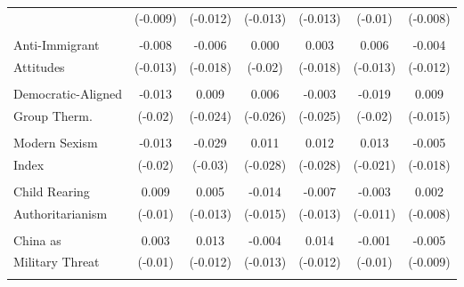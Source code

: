 \documentclass[12pt]{article}
\begin{document}
\begin{appendices}
\begin{refsection}
\begin{table}[!ht]
\begin{adjustbox}{width=\textwidth,center}
\begin{tabular}{@{\extracolsep{5pt}}lcccccc}
                     & (-0.009)           & (-0.012) & (-0.013)  & (-0.013)          & (-0.01)  & (-0.008)      \\
                     &                    &          &           &                   &          &               \\
Anti-Immigrant       & -0.008             & -0.006   & 0.000     & 0.003             & 0.006    & -0.004        \\
Attitudes            & (-0.013)           & (-0.018) & (-0.02)   & (-0.018)          & (-0.013) & (-0.012)      \\
                     &                    &          &           &                   &          &               \\
Democratic-Aligned   & -0.013             & 0.009    & 0.006     & -0.003            & -0.019   & 0.009         \\
Group Therm.         & (-0.02)            & (-0.024) & (-0.026)  & (-0.025)          & (-0.02)  & (-0.015)      \\
                     &                    &          &           &                   &          &               \\
Modern Sexism        & -0.013             & -0.029   & 0.011     & 0.012             & 0.013    & -0.005        \\
Index                & (-0.02)            & (-0.03)  & (-0.028)  & (-0.028)          & (-0.021) & (-0.018)      \\
                     &                    &          &           &                   &          &               \\
Child Rearing        & 0.009              & 0.005    & -0.014    & -0.007            & -0.003   & 0.002         \\
Authoritarianism     & (-0.01)            & (-0.013) & (-0.015)  & (-0.013)          & (-0.011) & (-0.008)      \\
                     &                    &          &           &                   &          &               \\
China as             & 0.003              & 0.013    & -0.004    & 0.014             & -0.001   & -0.005        \\
Military Threat      & (-0.01)            & (-0.012) & (-0.013)  & (-0.012)          & (-0.01)  & (-0.009)      \\
                     &                    &          &           &                   &          &               \\

\end{tabular}
\end{adjustbox}
\end{table}
\end{refsection}
\end{appendices}
\end{document}
